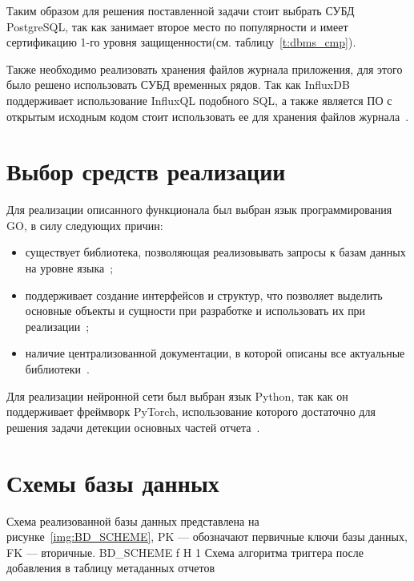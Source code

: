 Таким образом для решения поставленной задачи стоит выбрать СУБД PostgreSQL, так
как занимает второе место по популярности  и имеет сертификацию 1-го уровня
защищенности(см. таблицу~\ref{t:dbms_cmp}).

Также необходимо реализовать хранения файлов журнала приложения, для этого было
решено использовать СУБД временных рядов. Так как InfluxDB поддерживает
использование InfluxQL подобного SQL, а также является ПО с открытым исходным
кодом стоит использовать ее для хранения файлов журнала~\cite{time_db}.

\section{Выбор средств реализации}
Для реализации описанного функционала был выбран язык программирования GO, в
силу следующих причин:
\begin{itemize}
	\item существует библиотека, позволяющая реализовывать
	запросы к базам данных на уровне языка~\cite{gorm};
	\item поддерживает создание интерфейсов и структур, что позволяет выделить
	основные объекты и сущности при разработке и использовать их при
	реализации~\cite{go_interface};
	\item наличие централизованной документации, в которой описаны все актуальные библиотеки~\cite{go_package}.
\end{itemize}

Для реализации нейронной сети был выбран язык Python, так как он поддерживает
фреймворк PyTorch, использование которого достаточно для решения задачи детекции
основных частей отчета~\cite{pytorch}.

\section{Схемы базы данных}
Схема реализованной базы данных представлена на рисунке~\ref{img:BD_SCHEME}, PK
--- обозначают первичные ключи базы данных, FK --- вторичные.
{BD_SCHEME} %
{f} %
{H} %
{1\textwidth} %
{Схема алгоритма триггера после добавления в таблицу метаданных отчетов} %


